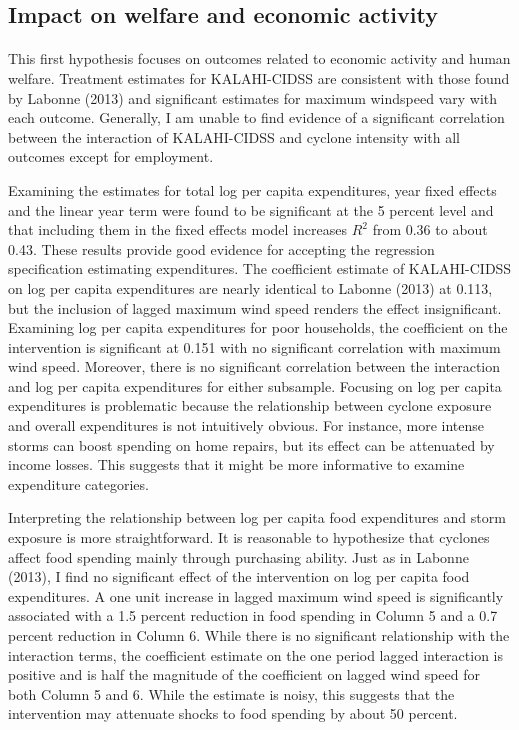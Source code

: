 \documentclass[12pt]{article}
\begin{document}


	\subsection{Impact on welfare and economic activity}

	\paragraph{ } This first hypothesis focuses on outcomes related to economic activity and human welfare. Treatment estimates for KALAHI-CIDSS are consistent with those found by Labonne (2013) and significant estimates for maximum windspeed vary with each outcome. Generally, I am unable to find evidence of a significant correlation between the interaction of KALAHI-CIDSS and cyclone intensity with all outcomes except for employment. 

	Examining the estimates for total log per capita expenditures, year fixed effects and the linear year term were found to be significant at the 5 percent level and that including them in the fixed effects model increases $R^2$ from 0.36 to about 0.43. These results provide good evidence for accepting the regression specification estimating expenditures. The coefficient estimate of KALAHI-CIDSS on log per capita expenditures are nearly identical to Labonne (2013) at 0.113, but the inclusion of lagged maximum wind speed renders the effect insignificant. Examining log per capita expenditures for poor households, the coefficient on the intervention is significant at 0.151 with no significant correlation with maximum wind speed. Moreover, there is no significant correlation between the interaction and log per capita expenditures for either subsample. Focusing on log per capita expenditures is problematic because the relationship between cyclone exposure and overall expenditures is not intuitively obvious. For instance, more intense storms can boost spending on home repairs, but its effect can be attenuated by income losses. This suggests that it might be more informative to examine expenditure categories. 

	Interpreting the relationship between log per capita food expenditures and storm exposure is more straightforward. It is reasonable to hypothesize that cyclones affect food spending mainly through purchasing ability. Just as in Labonne (2013), I find no significant effect of the intervention on log per capita food expenditures. A one unit increase in lagged maximum wind speed is significantly associated with a 1.5 percent reduction in food spending in Column 5 and a 0.7 percent reduction in Column 6. While there is no significant relationship with the interaction terms, the coefficient estimate on the one period lagged interaction is positive and is half the magnitude of the coefficient on lagged wind speed for both Column 5 and 6. While the estimate is noisy, this suggests that the intervention may attenuate shocks to food spending by about 50 percent.
\end{document}
